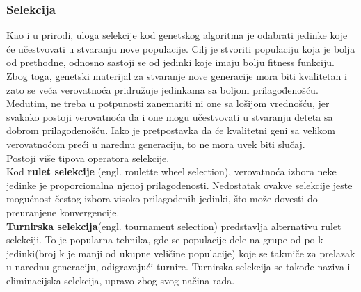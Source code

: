 \documentclass[a4paper]{article}
\begin{document}
\subsubsection{Selekcija}
Kao i u prirodi, uloga selekcije kod genetskog algoritma je odabrati jedinke koje će učestvovati u stvaranju nove populacije. Cilj je stvoriti populaciju koja je bolja od prethodne, odnosno sastoji se od jedinki koje imaju bolju fitness funkciju. Zbog toga, genetski materijal za stvaranje nove generacije mora biti kvalitetan i zato se veća verovatnoća pridružuje jedinkama sa boljom prilagođenošću. Međutim, ne treba u potpunosti zanemariti ni one sa lošijom vrednošću, jer svakako postoji verovatnoća da i one mogu učestvovati u stvaranju deteta sa dobrom prilagođenošću. Iako je pretpostavka da će kvalitetni geni sa velikom verovatnoćom preći u narednu generaciju, to ne mora uvek biti slučaj.\\
Postoji više tipova operatora selekcije.\\
Kod \textbf{rulet selekcije} (engl. roulette wheel selection), verovatnoća izbora neke jedinke je proporcionalna njenoj prilagođenosti. Nedostatak ovakve selekcije jeste mogućnost čestog izbora visoko prilagođenih jedinki, što može dovesti do preuranjene konvergencije.\\
\textbf{Turnirska selekcija}(engl. tournament selection) predstavlja alternativu rulet selekciji. To je popularna tehnika, gde se populacije dele na grupe od po k jedinki(broj k je manji od ukupne veličine populacije) koje se takmiče za prelazak u narednu generaciju, odigravajući turnire. Turnirska selekcija se takođe naziva i eliminacijska selekcija, upravo zbog svog načina rada.
\end{document}
